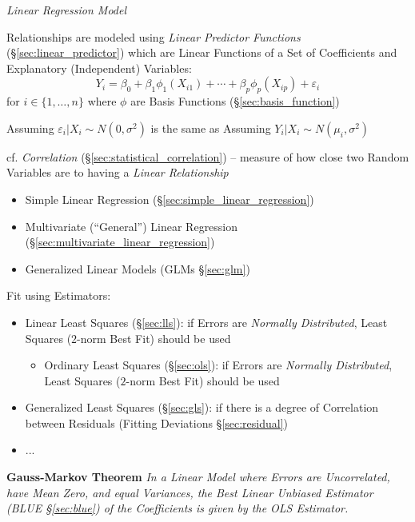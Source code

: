 \emph{Linear Regression Model}

Relationships are modeled using \emph{Linear Predictor Functions}
(\S\ref{sec:linear_predictor}) which are Linear Functions of a Set of
Coefficients and Explanatory (Independent) Variables:
\[
  Y_i = \beta_0 + \beta_1\phi_1(X_{i1}) + \cdots +
    \beta_p\phi_p(X_{ip}) + \varepsilon_i
\]
for $i \in \{1, \ldots, n\}$ where $\phi$ are Basis Functions
(\S\ref{sec:basis_function})

Assuming $\varepsilon_i | X_i \sim N(0, \sigma^2)$ is the same as Assuming
$Y_i | X_i \sim N(\mu_i, \sigma^2)$

cf. \emph{Correlation} (\S\ref{sec:statistical_correlation}) -- measure of how
close two Random Variables are to having a \emph{Linear Relationship}

\begin{itemize}
  \item Simple Linear Regression (\S\ref{sec:simple_linear_regression})
  \item Multivariate (``General'') Linear Regression
    (\S\ref{sec:multivariate_linear_regression})
  \item Generalized Linear Models (GLMs \S\ref{sec:glm})
\end{itemize}

Fit using Estimators:
\begin{itemize}
  \item Linear Least Squares (\S\ref{sec:lls}): if Errors are
    \emph{Normally Distributed}, Least Squares ($2$-norm Best Fit) should be
    used
    \begin{itemize}
      \item Ordinary Least Squares (\S\ref{sec:ols}): if Errors are
        \emph{Normally Distributed}, Least Squares ($2$-norm Best Fit) should be
        used
    \end{itemize}
  \item Generalized Least Squares (\S\ref{sec:gls}): if
    there is a degree of Correlation between Residuals (Fitting Deviations
    \S\ref{sec:residual})
  \item ...
\end{itemize}

\textbf{Gauss-Markov Theorem} \emph{
  In a Linear Model where Errors are Uncorrelated, have Mean Zero, and equal
  Variances, the Best Linear Unbiased Estimator (BLUE \S\ref{sec:blue}) of the
  Coefficients is given by the OLS Estimator.
}

